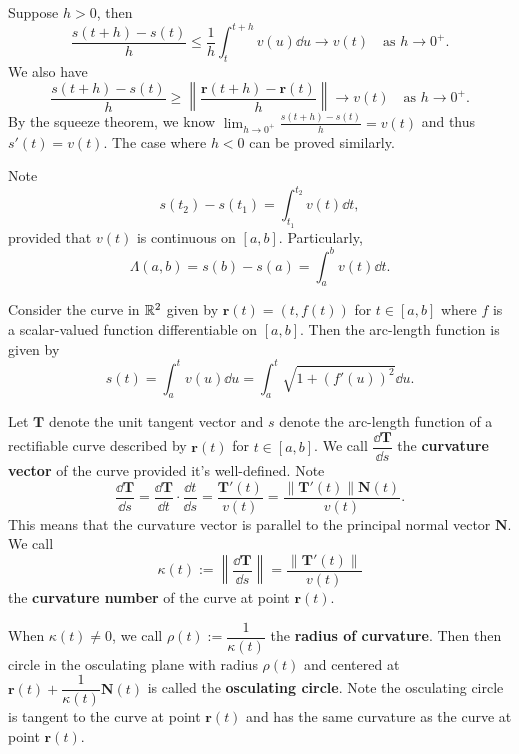     \begin{proofenv}
        Suppose $h>0$, then
        $$ \frac{s(t+h) - s(t)}{h} \le \frac1h \int_t^{t+h} v(u) \dd u \to v(t) \quad \text{as } h\to 0^+. $$
        We also have
        $$ \frac{s(t+h) - s(t)}{h} \ge \left\|\frac{\bm r(t+h) - \bm r(t)}{h}\right\| \to v(t) \quad \text{as } h\to 0^+. $$
        By the squeeze theorem, we know $\displaystyle \lim_{h\to 0^+} \frac{s(t+h) - s(t)}{h} = v(t)$ and thus $s'(t) = v(t)$. The case where $h<0$ can be proved similarly.
    \end{proofenv}
    \begin{remarkenv}
        Note
        $$ s(t_2) - s(t_1) = \int_{t_1}^{t_2} v(t) \dd t,$$
        provided that $v(t)$ is continuous on $[a,b]$. Particularly, $$\Lambda(a,b) = s(b) - s(a) = \int_a^b v(t) \dd t.$$
    \end{remarkenv}
    \begin{exampleenv}
        Consider the curve in $\mathbb{R}^2$ given by $\bm r(t) = (t, f(t))$ for $t\in [a,b]$ where $f$ is a scalar-valued function differentiable on $[a,b]$. Then the arc-length function is given by
        $$ s(t) = \int_a^t v(u) \dd u = \int_a^t \sqrt{1 + (f'(u))^2} \dd u. $$
    \end{exampleenv}
    \begin{definitionenv}
        Let $\bm T$ denote the unit tangent vector and $s$ denote the arc-length function of a rectifiable curve described by $\bm r(t)$ for $t\in [a,b]$. We call $\dfrac{\dd \bm T}{\dd s}$ the \textbf{curvature vector} of the curve provided it's well-defined. Note
        $$ \frac{\dd \bm T}{\dd s} = \frac{\dd \bm T}{\dd t} \cdot \frac{\dd t}{\dd s} = \frac{\bm T'(t)}{v(t)} = \frac{\left\|\bm T'(t)\right\| \bm N(t)}{v(t)}. $$
        This means that the curvature vector is parallel to the principal normal vector $\bm N$. We call $$\kappa(t) := \left\| \dfrac{\dd \bm T}{\dd s}\right\| = \dfrac{\left\|\bm T'(t)\right\|}{v(t)}$$ the \textbf{curvature number} of the curve at point $\bm r(t)$.
    \end{definitionenv}
    \begin{definitionenv}
        When $\kappa(t) \ne 0$, we call $\rho(t) := \dfrac{1}{\kappa(t)}$ the \textbf{radius of curvature}. Then then circle in the osculating plane with radius $\rho(t)$ and centered at $\bm r(t) + \dfrac{1}{\kappa(t)} \bm N(t)$ is called the \textbf{osculating circle}. Note the osculating circle is tangent to the curve at point $\bm r(t)$ and has the same curvature as the curve at point $\bm r(t)$.
    \end{definitionenv}

